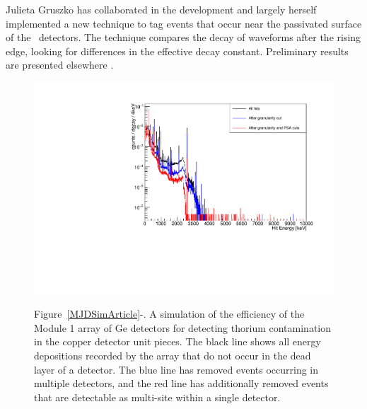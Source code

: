 Julieta Gruszko has collaborated in the development and largely herself implemented a new technique to tag events that occur near the passivated surface of the \MJ\ detectors. The technique compares the decay of waveforms after the rising edge, looking for differences in the effective decay constant. Preliminary results are presented elsewhere .

\begin{figure}
\begin{center}
\hfil  \includegraphics[width=.48\textwidth]{M1DUThCombined.pdf} \hfil 

\end{center}
 \hfil \parbox{.5\textwidth}{\small Figure~\ref{MJDSimArticle}-. A simulation of the efficiency of the Module 1 array of Ge detectors for detecting thorium contamination in the copper detector unit pieces. The black line shows all energy depositions recorded by the array that do not occur in the dead layer of a detector. The blue line has removed events occurring in multiple detectors, and the red line has additionally removed events that are detectable as multi-site within a single detector. }  \hfil

\label{sim}  %

\end{figure}

